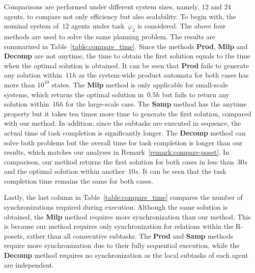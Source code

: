 Comparisons are performed under different system sizes,
namely, $12$ and $24$ agents, to compare not only efficiency but also scalability.
To begin with, the nominal system of~$12$ agents under task~$\varphi_2$ is considered.
The above four methods are used to solve the same planning problem. The results are 
summarized in Table~\ref{table:compare_time}.
Since the methods \textbf{Prod}, \textbf{Milp} and \textbf{Decomp} are not
anytime, the time to obtain  the first solution equals to the time
when the optimal solution is obtained.
It can be seen that \textbf{Prod} fails to generate any solution
within~$11h$ as the system-wide product automata for both cases
has more than $10^{19}$ states.
The \textbf{Milp} method is only applicable for small-scale systems,
which returns the optimal solution in~$0.5h$ but fails to
return any solution within~$16h$ for the large-scale case.
The \textbf{Samp} method has the anytime property but it takes ten times
more time to generate
the first  solution, compared with our method.
In addition, since the subtasks are executed in sequence,
the actual time of task completion is significantly longer.
The \textbf{Decomp} method can solve both problems but the overall time
for task completion is longer than our results,
which matches our analyses in Remark~\ref{remark:compare-poset}.
In comparison, our method returns the first solution for both cases in less
than~$30s$ and the optimal solution within another~$10s$.
It can be seen that the task completion time remains the same for both cases.

Lastly, the last column in Table~\ref{table:compare_time} compares the number
of synchronizations required during execution.
Although the same solution is obtained, the \textbf{Milp} method requires more
synchronization than our method.
This is because our method requires only synchronization for relations within the
R-posets, rather than all consecutive subtasks.
The \textbf{Prod} and \textbf{Samp} methods require more synchronization due to
their fully sequential execution,
while the \textbf{Decomp} method requires no synchronization as
the local subtasks of each agent are independent.

